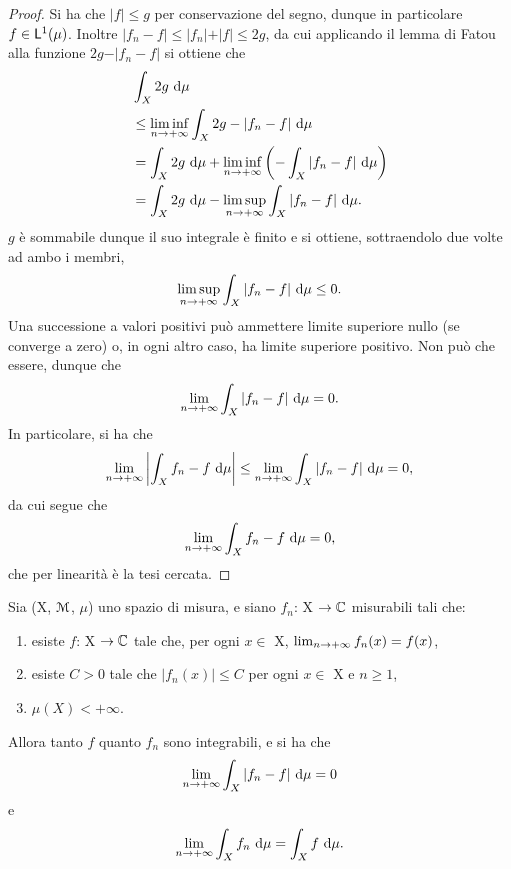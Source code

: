 \documentclass[Completo.tex]{subfiles}
\begin{document}
	\begin{proof}
		Si ha che $\vert f \vert \leq g$ per conservazione del segno, dunque in particolare $f \in \sf[L]^1(\mu)$. Inoltre $\vert f_n - f \vert \leq \vert f_n \vert + \vert f \vert \leq 2g$, da cui applicando il lemma di Fatou alla funzione $2g - \vert f_n - f \vert$ si ottiene che
		\begin{align*}
		&\int_X 2g \ \mathrm{d}\mu \\
		&\leq \liminf_{n \rightarrow +\infty} \int_X 2g-\vert f_n - f \vert \ \mathrm{d}\mu \\
		&= \int_X 2g \ \mathrm{d}\mu + \liminf_{n \rightarrow +\infty} \left(-\int_X \vert f_n - f \vert \ \mathrm{d}\mu\right) \\
		&= \int_X 2g \ \mathrm{d}\mu - \limsup_{n \rightarrow +\infty} \int_X \vert f_n - f \vert \ \mathrm{d}\mu.
		\end{align*}
		$g$ è sommabile dunque il suo integrale è finito e si ottiene, sottraendolo due volte ad ambo i membri,
		\begin{equation*}
		\limsup_{n \rightarrow +\infty} \int_X \vert f_n - f \vert \ \mathrm{d}\mu \leq 0.
		\end{equation*}
		Una successione a valori positivi può ammettere limite superiore nullo (se converge a zero) o, in ogni altro caso, ha limite superiore positivo. Non può che essere, dunque che
		\begin{equation*}
		\lim_{n \rightarrow +\infty} \int_X \vert f_n - f \vert \ \mathrm{d}\mu = 0.
		\end{equation*}
		In particolare, si ha che
		\begin{equation*}
		\lim_{n \rightarrow +\infty} \left\vert \int_X f_n - f \ \mathrm{d}\mu \right\vert \leq \lim_{n \rightarrow +\infty} \int_X \vert f_n - f \vert \ \mathrm{d}\mu = 0,
		\end{equation*}
		da cui segue che
		\begin{equation*}
		\lim_{n \rightarrow +\infty} \int_X f_n - f \ \mathrm{d}\mu = 0,
		\end{equation*}
		che per linearità è la tesi cercata.
	\end{proof}
	\begin{Cor}
		Sia (X, $\eu[M]$, $\mu$) uno spazio di misura, e siano $f_n$: X $\ra \bb[C]$ misurabili tali che:
		\begin{enumerate}
			\item esiste $f$: X $\ra \bb[C]$ tale che, per ogni $x \in$ X, $\lim_{n \rightarrow +\infty} f_n(x) = f(x)$,
			\item esiste $C > 0$ tale che $\vert f_n(x) \vert \leq C$ per ogni $x \in$ X e $n\geq1$,
			\item $\mu(X) < +\infty$.
		\end{enumerate}
		Allora tanto $f$ quanto $f_n$ sono integrabili, e si ha che
		\begin{equation*}
		\lim_{n \rightarrow +\infty} \int_X \vert f_n - f \vert \ \mathrm{d}\mu = 0
		\end{equation*}
		e
		\begin{equation*}
		\lim_{n \rightarrow +\infty} \int_X f_n \ \mathrm{d}\mu = \int_X f \ \mathrm{d}\mu.
		\end{equation*}
	\end{Cor}
\end{document}
